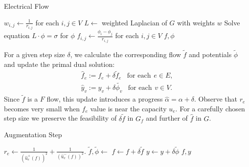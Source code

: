 \begin{algorithm}
\caption{Electrical Flow}
\begin{algorithmic}[1]
\State $w_{i,j} \gets \frac{1}{r_{i,j}}$ for each $i,j\in V$ 
\State $L \gets$ weighted Laplacian of $G$ with weights $w$
\State Solve equation $L\cdot \phi = \sigma$ for $\phi$
\State $f_{i,j} \gets \frac{\phi_i-\phi_j}{r_{i,j}}$ for each $i,j \in V$
\State \Return $f, \phi$
\EndFunction
\end{algorithmic}
\end{algorithm}

For a given step size $\delta$, we calculate the corresponding flow $\tilde  f$ and potentials $\tilde{\phi}$ and update the primal dual solution:
\begin{equation} \label{augemntation_step}
\begin{split}
\hat f_e := f_e+\delta\tilde  f_e \hspace{10pt} \text{for each} \hspace{5pt} e \in E,\\
\hat y_v := y_v+\delta\tilde{\phi_v} \hspace{10pt} \text{for each} \hspace{5pt} v \in V.
\end{split}
\end{equation}
Since $\tilde  f$ is a $F$ flow, this update introduces a progress $\hat{\alpha}=\alpha+\delta$.
Observe that $r_e$ becomes very small when $f_e$ value is near the capacity $u_e$. For a carefully chosen step size we preserve the feasibility of $\delta\tilde  f$ in $G_f$ and further of $\hat f$ in $G$.

\begin{algorithm}
\caption{Augmentation Step}
\begin{algorithmic}[1]
    \State $r_e \gets \frac{1}{(\hat u_e^+(f))^2} + \frac{1}{(\hat u_e^-(f))^2}.$
\EndFor
\State $\tilde f, \tilde\phi \gets$ 
\State $f \gets f + \delta\tilde f$
\State $y \gets y + \delta\tilde \phi$
\State \Return $f,y$
\EndFunction
\end{algorithmic}
\end{algorithm}

